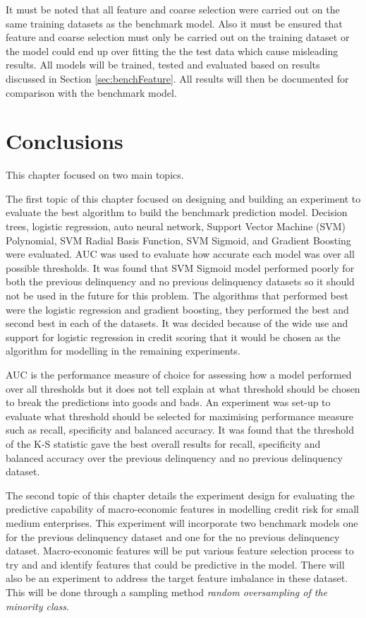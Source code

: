 It must be noted that all feature and coarse selection were carried out on the same training datasets as the benchmark model. Also it must be ensured that feature and coarse selection must only be carried out on the training dataset or the model could end up over fitting the the test data which cause misleading results. All models will be trained, tested and evaluated based on results discussed in Section \ref{sec:benchFeature}. All results will then be documented for comparison with the benchmark model. 


\section{Conclusions}
This chapter focused on two main topics. 

The first topic of this chapter focused on designing and building an experiment to evaluate the best algorithm to build the benchmark prediction model. Decision trees, logistic regression, auto neural network, Support Vector Machine (SVM) Polynomial, SVM Radial Basis Function, SVM Sigmoid, and Gradient Boosting were evaluated. AUC was used to evaluate how accurate each model was over all possible thresholds. It was found that SVM Sigmoid model performed poorly for both the previous delinquency and no previous delinquency datasets so it should not be used in the future for this problem. The algorithms that performed best were the logistic regression and gradient boosting, they performed the best and second best in each of the datasets. It was decided because of the wide use and support for logistic regression in credit scoring that it would be chosen as the algorithm for modelling in the remaining experiments. 

AUC is the performance measure of choice for assessing how a model performed over all thresholds but it does not tell explain at what threshold should be chosen to break the predictions into goods and bads. An experiment was set-up to evaluate what threshold should be selected for maximising performance measure such as recall, specificity and balanced accuracy. It was found that the threshold of the K-S statistic gave the best overall results for recall, specificity and balanced accuracy over the previous delinquency and no previous delinquency dataset.

The second topic of this chapter details the experiment design for evaluating the predictive capability of macro-economic features in modelling credit risk for small medium enterprises. This experiment will incorporate two benchmark models one for the previous delinquency dataset and one for the no previous delinquency dataset. Macro-economic features will be put various feature selection process to try and and identify features that could be predictive in the model. There will also be an experiment to address the target feature imbalance in these dataset. This will be done through a sampling method \textit{random oversampling of the minority class}.